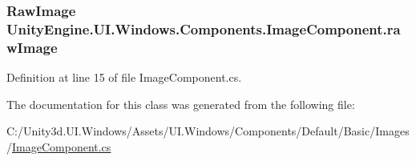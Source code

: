 \subsubsection[{raw\+Image}]{\setlength{\rightskip}{0pt plus 5cm}Raw\+Image Unity\+Engine.\+U\+I.\+Windows.\+Components.\+Image\+Component.\+raw\+Image}\label{class_unity_engine_1_1_u_i_1_1_windows_1_1_components_1_1_image_component_a6671472654ac3b838678ede9761fc4f0}


Definition at line 15 of file Image\+Component.\+cs.



The documentation for this class was generated from the following file\+:\begin{DoxyCompactItemize}
\item 
C\+:/\+Unity3d.\+U\+I.\+Windows/\+Assets/\+U\+I.\+Windows/\+Components/\+Default/\+Basic/\+Images/\hyperlink{_image_component_8cs}{Image\+Component.\+cs}\end{DoxyCompactItemize}
